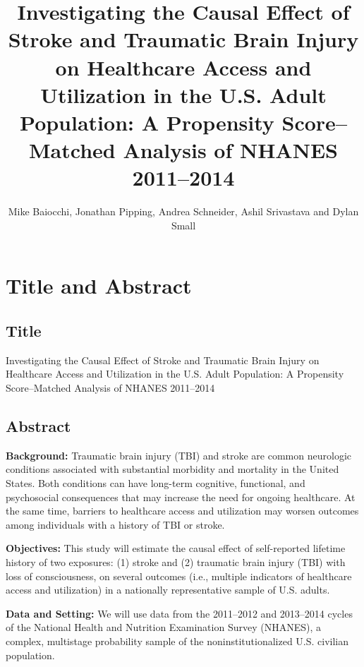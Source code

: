 \documentclass{article}
\title{Investigating the Causal Effect of Stroke and Traumatic Brain Injury on Healthcare Access and Utilization in the U.S. Adult Population: A Propensity Score--Matched Analysis of NHANES 2011--2014}
\author{Mike Baiocchi, Jonathan Pipping, Andrea Schneider, 
Ashil Srivastava and Dylan Small}
\date{}
\begin{document}
\pagestyle{fancy}
\fancyhf{}
\fancyhead[L]{\leftmark}
\fancyfoot[C]{\thepage}
\renewcommand{\headrulewidth}{0.4pt}
\renewcommand{\footrulewidth}{0pt}

\maketitle

\tableofcontents

\pagebreak

\section{Title and Abstract}

\subsection{Title}

Investigating the Causal Effect of Stroke and Traumatic Brain Injury on Healthcare Access and Utilization in the U.S. Adult Population: A Propensity Score--Matched Analysis of NHANES 2011--2014

\subsection{Abstract}

\textbf{Background:} Traumatic brain injury (TBI) and stroke are common neurologic conditions associated with substantial morbidity and mortality in the United States. Both conditions can have long-term cognitive, functional, and psychosocial consequences that may increase the need for ongoing healthcare. At the same time, barriers to healthcare access and utilization may worsen outcomes among individuals with a history of TBI or stroke.

\textbf{Objectives:} This study will estimate the causal effect of self-reported lifetime history of two exposures: (1) stroke and (2) traumatic brain injury (TBI) with loss of consciousness, on several outcomes (i.e., multiple indicators of healthcare access and utilization) in a nationally representative sample of U.S. adults.

\textbf{Data and Setting:} We will use data from the 2011--2012 and 2013--2014 cycles of the National Health and Nutrition Examination Survey (NHANES), a complex, multistage probability sample of the noninstitutionalized U.S. civilian population.
\end{document}
